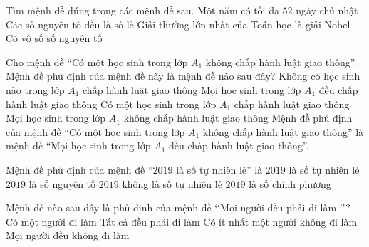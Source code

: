 \begin{ex}%
Tìm mệnh đề đúng trong các mệnh đề sau.
\choice
{Một năm có tối đa $52$ ngày chủ nhật}
{Các số nguyên tố đều là số lẻ}
{Giải thưởng lớn nhất của Toán học là giải Nobel}
{\True Có vô số số nguyên tố}
\end{ex}

\begin{ex}%
	Cho mệnh đề ``Có một học sinh trong lớp $A_1$ không chấp hành luật giao thông''. Mệnh đề phủ định của mệnh đề này là mệnh đề nào sau đây?
	\choice
	{Không có học sinh nào trong lớp $A_1$ chấp hành luật giao thông}
	{\True Mọi học sinh trong lớp $A_1$ đều chấp hành luật giao thông}
	{Có một học sinh trong lớp $A_1$ chấp hành luật giao thông}
	{Mọi học sinh trong lớp $A_1$ không chấp hành luật giao thông}
	\loigiai
	{
		Mệnh đề phủ định của mệnh đề ``Có một học sinh trong lớp $A_1$ không chấp hành luật giao thông'' là mệnh đề ``Mọi học sinh trong lớp $A_1$ đều chấp hành luật giao thông''.
	}
\end{ex} 

\begin{ex}%
	Mệnh đề phủ định của mệnh đề “$2019$ là số tự nhiên lẻ” là
	\choice
	{$2019$ là số tự nhiên lẻ}
	{$2019$ là số nguyên tố}
	{\True $2019$ không là số tự nhiên lẻ}
	{$2019$ là số chính phương}
\end{ex}

\begin{ex}%
	Mệnh đề nào sau đây là phủ định của mệnh đề  \lq\lq Mọi người đều phải đi làm \rq\rq?
	\choice
	{Có một người đi làm}
	{Tất cả đều phải đi làm}
	{\True Có ít nhất một người không đi làm}
	{Mọi người đều không đi làm}
\end{ex}

